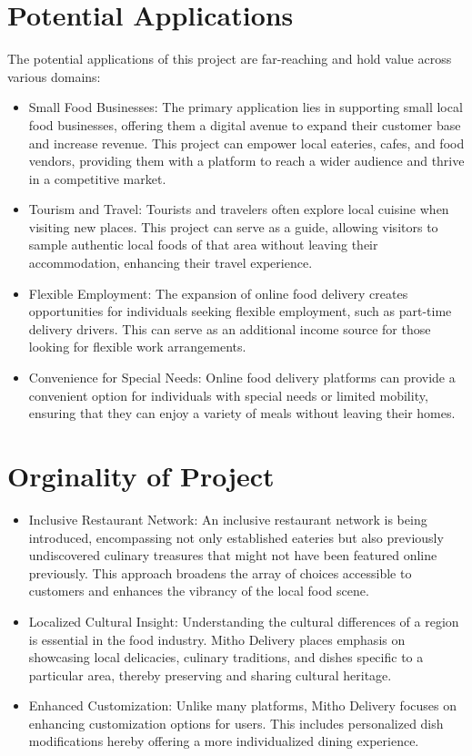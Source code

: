 \section{Potential Applications}
The potential applications of this project are far-reaching and hold value across various domains:
\begin{itemize}
    \item Small Food Businesses: The primary application lies in supporting small local food businesses, offering them a digital avenue to expand their customer base and increase revenue. This project can empower local eateries, cafes, and food vendors, providing them with a platform to reach a wider audience and thrive in a competitive market.
    \item Tourism and Travel: Tourists and travelers often explore local cuisine when visiting new places. This project can serve as a guide, allowing visitors to sample authentic local foods of that area without leaving their accommodation, enhancing their travel experience.
    \item Flexible Employment: The expansion of online food delivery creates opportunities for individuals seeking flexible employment, such as part-time delivery drivers. This can serve as an additional income source for those looking for flexible work arrangements.
    \item Convenience for Special Needs: Online food delivery platforms can provide a convenient option for individuals with special needs or limited mobility, ensuring that they can enjoy a variety of meals without leaving their homes.
\end{itemize}

\section{Orginality of Project}
\begin{itemize}
    \item Inclusive Restaurant Network: An inclusive restaurant network is being introduced, encompassing not only established eateries but also previously undiscovered culinary treasures that might not have been featured online previously. This approach broadens the array of choices accessible to customers and enhances the vibrancy of the local food scene.
    \item Localized Cultural Insight: Understanding the cultural differences of a region is essential in the food industry. Mitho Delivery places emphasis on showcasing local delicacies, culinary traditions, and dishes specific to a particular area, thereby preserving and sharing cultural heritage.
    \item Enhanced Customization: Unlike many platforms, Mitho Delivery focuses on enhancing customization options for users. This includes personalized dish modifications hereby offering a more individualized dining experience.
\end{itemize}

